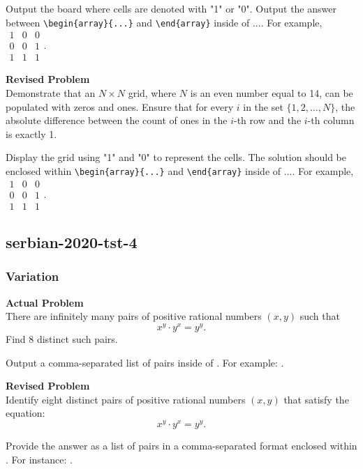 Output the board where cells are denoted with "1" or "0". Output the answer between \verb|\begin{array}{...}| and \verb|\end{array}| inside of $\boxed{...}$. For example, $\boxed{\begin{array}{ccc}1 & 0 & 0 \\ 0 & 0 & 1 \\ 1 & 1 & 1\end{array}}$.

\textbf{Revised Problem}\\
Demonstrate that an $N \times N$ grid, where $N$ is an even number equal to 14, can be populated with zeros and ones. Ensure that for every $i$ in the set $\{1, 2, \ldots, N\}$, the absolute difference between the count of ones in the $i$-th row and the $i$-th column is exactly 1.

Display the grid using "1" and "0" to represent the cells. The solution should be enclosed within \verb|\begin{array}{...}| and \verb|\end{array}| inside of $\boxed{...}$. For example, $\boxed{\begin{array}{ccc}1 & 0 & 0 \\ 0 & 0 & 1 \\ 1 & 1 & 1\end{array}}$.

\subsection{serbian-2020-tst-4}
\subsubsection{Variation}
\textbf{Actual Problem}\\
There are infinitely many pairs of positive rational numbers $(x, y)$ such that 
$$ 
x^y \cdot y^x = y^y.
$$ 
Find $8$ distinct such pairs. 


Output a comma-separated list of pairs inside of \boxed. For example: .

\textbf{Revised Problem}\\
Identify eight distinct pairs of positive rational numbers \((x, y)\) that satisfy the equation:
$$ 
x^y \cdot y^x = y^y.
$$

Provide the answer as a list of pairs in a comma-separated format enclosed within \boxed. For instance: .

